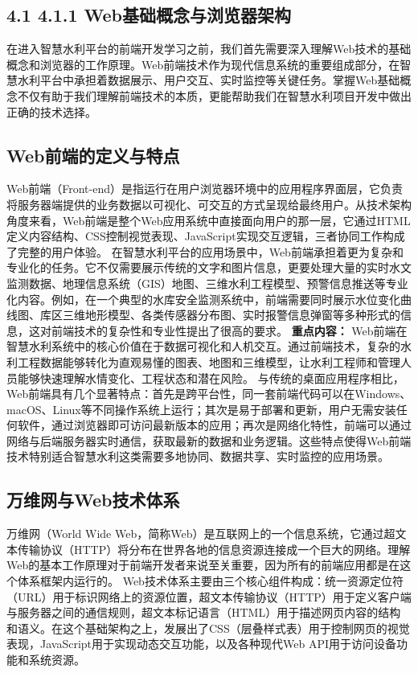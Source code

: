 \subsection{4.1 4.1.1 Web基础概念与浏览器架构}\label{webux57faux7840ux6982ux5ff5ux4e0eux6d4fux89c8ux5668ux67b6ux6784} 在进入智慧水利平台的前端开发学习之前，我们首先需要深入理解Web技术的基础概念和浏览器的工作原理。Web前端技术作为现代信息系统的重要组成部分，在智慧水利平台中承担着数据展示、用户交互、实时监控等关键任务。掌握Web基础概念不仅有助于我们理解前端技术的本质，更能帮助我们在智慧水利项目开发中做出正确的技术选择。 \subsection{Web前端的定义与特点}\label{webux524dux7aefux7684ux5b9aux4e49ux4e0eux7279ux70b9} Web前端（Front-end）是指运行在用户浏览器环境中的应用程序界面层，它负责将服务器端提供的业务数据以可视化、可交互的方式呈现给最终用户。从技术架构角度来看，Web前端是整个Web应用系统中直接面向用户的那一层，它通过HTML定义内容结构、CSS控制视觉表现、JavaScript实现交互逻辑，三者协同工作构成了完整的用户体验。 在智慧水利平台的应用场景中，Web前端承担着更为复杂和专业化的任务。它不仅需要展示传统的文字和图片信息，更要处理大量的实时水文监测数据、地理信息系统（GIS）地图、三维水利工程模型、预警信息推送等专业化内容。例如，在一个典型的水库安全监测系统中，前端需要同时展示水位变化曲线图、库区三维地形模型、各类传感器分布图、实时报警信息弹窗等多种形式的信息，这对前端技术的复杂性和专业性提出了很高的要求。 \textbf{重点内容：} Web前端在智慧水利系统中的核心价值在于数据可视化和人机交互。通过前端技术，复杂的水利工程数据能够转化为直观易懂的图表、地图和三维模型，让水利工程师和管理人员能够快速理解水情变化、工程状态和潜在风险。 与传统的桌面应用程序相比，Web前端具有几个显著特点：首先是跨平台性，同一套前端代码可以在Windows、macOS、Linux等不同操作系统上运行；其次是易于部署和更新，用户无需安装任何软件，通过浏览器即可访问最新版本的应用；再次是网络化特性，前端可以通过网络与后端服务器实时通信，获取最新的数据和业务逻辑。这些特点使得Web前端技术特别适合智慧水利这类需要多地协同、数据共享、实时监控的应用场景。 \subsection{万维网与Web技术体系}\label{ux4e07ux7ef4ux7f51ux4e0ewebux6280ux672fux4f53ux7cfb} 万维网（World Wide Web，简称Web）是互联网上的一个信息系统，它通过超文本传输协议（HTTP）将分布在世界各地的信息资源连接成一个巨大的网络。理解Web的基本工作原理对于前端开发者来说至关重要，因为所有的前端应用都是在这个体系框架内运行的。 Web技术体系主要由三个核心组件构成：统一资源定位符（URL）用于标识网络上的资源位置，超文本传输协议（HTTP）用于定义客户端与服务器之间的通信规则，超文本标记语言（HTML）用于描述网页内容的结构和语义。在这个基础架构之上，发展出了CSS（层叠样式表）用于控制网页的视觉表现，JavaScript用于实现动态交互功能，以及各种现代Web API用于访问设备功能和系统资源。 